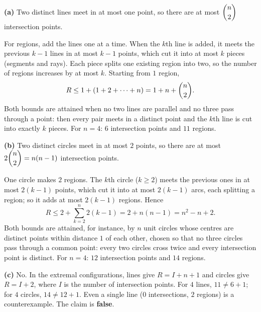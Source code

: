 \textbf{(a)} Two distinct lines meet in at most one point, so there are at most $\dbinom n2$ intersection points.

For regions, add the lines one at a time. When the $k$th line is added, it meets the previous $k-1$ lines in at most $k-1$ points, which cut it into at most $k$ pieces (segments and rays). Each piece splits one existing region into two, so the number of regions increases by at most $k$. Starting from $1$ region,
\[
R\le 1+(1+2+\cdots+n)=1+n+\dbinom n2.
\]
Both bounds are attained when no two lines are parallel and no three pass through a point: then every pair meets in a distinct point and the $k$th line is cut into exactly $k$ pieces. For $n=4$: $\boxed{6}$ intersection points and $\boxed{11}$ regions.

\textbf{(b)} Two distinct circles meet in at most $2$ points, so there are at most $2\dbinom n2=n(n-1)$ intersection points.

One circle makes $2$ regions. The $k$th circle ($k\ge2$) meets the previous ones in at most $2(k-1)$ points, which cut it into at most $2(k-1)$ arcs, each splitting a region; so it adds at most $2(k-1)$ regions. Hence
\[
R\le 2+\sum_{k=2}^{n}2(k-1)=2+n(n-1)=n^2-n+2.
\]
Both bounds are attained, for instance, by $n$ unit circles whose centres are distinct points within distance $1$ of each other, chosen so that no three circles pass through a common point: every two circles cross twice and every intersection point is distinct. For $n=4$: $\boxed{12}$ intersection points and $\boxed{14}$ regions.

\textbf{(c)} No. In the extremal configurations, lines give $R=I+n+1$ and circles give $R=I+2$, where $I$ is the number of intersection points. For $4$ lines, $11\ne 6+1$; for $4$ circles, $14\ne 12+1$. Even a single line ($0$ intersections, $2$ regions) is a counterexample. The claim is \textbf{false}.
